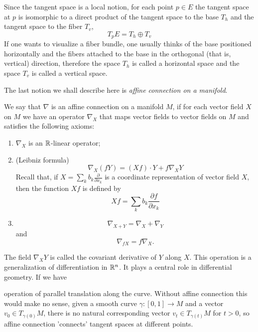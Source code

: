 Since the tangent space is a local notion, for each point $p \in E$
the tangent space at $p$ is isomorphic to a direct product
of the tangent space to the base $T_h$ and the tangent space to the fiber $T_v$,
\begin{equation}
    T_p E = T_h \oplus T_v
\end{equation}
If one wants to visualize a fiber bundle,
one usually thinks of the base positioned horizontally and the fibers
attached to the base in the orthogonal (that is, vertical) direction,
therefore the space $T_h$ is called a horizontal space and the space $T_v$
is called a vertical space.


The last notion we shall describe here is \textit{affine connection on a manifold}.

We say that $\nabla$ is an affine connection on a manifold $M$,
if for each vector field $X$ on $M$ we have an operator $\nabla_X$ that
maps vector fields to vector fields on $M$ and satisfies 
the following axioms:
\begin{enumerate}
    \item $\nabla_X$ is an $\mathbb{R}$-linear operator;
    \item (Leibniz formula) $$\nabla_X(fY) = (Xf) \cdot Y + f \nabla_X Y $$
        Recall that, if $X = \sum_k b_k \frac{\partial}{\partial x_k}$ is a coordinate representation 
        of vector field $X$, then the function
        $Xf$ is defined by
        $$Xf = \sum_k b_k \frac{\partial f}{\partial x_k}$$
    \item $$ \nabla_{X + Y} = \nabla_X + \nabla_Y $$
        and
        $$ \nabla_{fX} = f \nabla_X.$$
\end{enumerate}
The field $\nabla_{X} Y$ is called the covariant derivative of $Y$ along $X$.
This operation is a generalization of differentiation in $\mathbb{R}^n$.
It plays a central role in differential geometry. If we have 

operation of parallel translation along the curve. Without affine connection
this would make no sense, given a smooth curve $\gamma : [0,1] \to M$ and a vector
$v_0 \in T_{\gamma(0)}M$, there is no natural corresponding vector $v_t \in T_{\gamma(t)}M$ for $t > 0$,
so affine connection 'connects' tangent spaces at different points.




